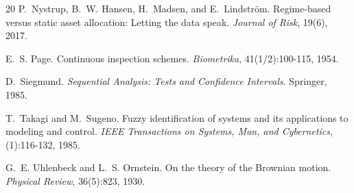 \documentclass[11pt]{article}
\begin{document}
\begin{thebibliography}{20}
P.~Nystrup, B.~W. Hansen, H.~Madsen, and E.~Lindstr\"{o}m.
\newblock Regime-based versus static asset allocation: Letting the data
  speak.
\newblock \emph{Journal of Risk}, 19(6), 2017.

E.~S. Page.
\newblock Continuous inspection schemes.
\newblock \emph{Biometrika}, 41(1/2):100-115, 1954.

D.~Siegmund.
\newblock \emph{Sequential Analysis: Tests and Confidence Intervals}.
\newblock Springer, 1985.

T.~Takagi and M.~Sugeno.
\newblock Fuzzy identification of systems and its applications to
  modeling and control.
\newblock \emph{IEEE Transactions on Systems, Man, and Cybernetics},
  (1):116-132, 1985.

G.~E. Uhlenbeck and L.~S. Ornstein.
\newblock On the theory of the {Brownian} motion.
\newblock \emph{Physical Review}, 36(5):823, 1930.

\end{thebibliography}
\end{document}
